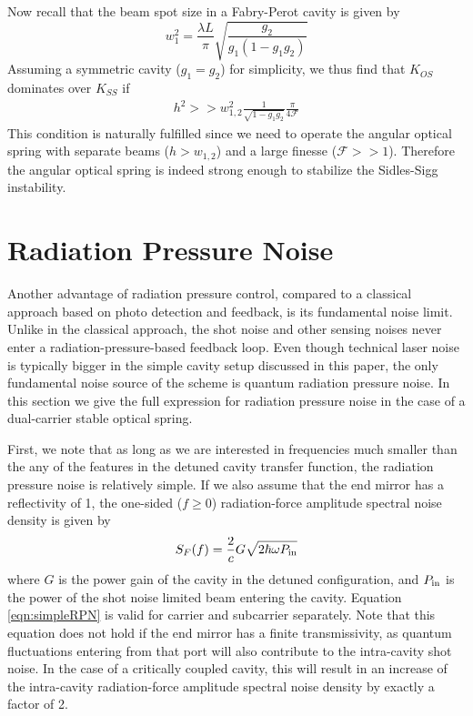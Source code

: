 \documentclass[%
 reprint,
 amsmath,amssymb,
 aps,
]{revtex4-1}
\begin{document}
Now recall that the beam spot size in a Fabry-Perot cavity is given by \cite{Siegman86}
\begin{equation}
w_1^2 = \frac{\lambda L}{\pi} \sqrt{\frac{g_2}{g_1(1-g_1 g_2)}}
\label{equ:spotsize1}
\end{equation} 
Assuming a symmetric cavity ($g_1=g_2$) for simplicity, we thus find that $K_{OS}$  dominates over $K_{SS}$ if
\begin{eqnarray}
\label{eqn:h2w}
h^2 >> w_{1,2}^2 \frac{1}{\sqrt{1-g_1 g_2}} \frac{\pi}{4 \mathcal{F}}
\end{eqnarray}
This condition is naturally fulfilled since we need to operate the angular optical spring with separate beams ($h>w_{1,2}$) and a large finesse ($\mathcal{F}>>1$). Therefore the angular optical spring is indeed strong enough to stabilize the Sidles-Sigg instability.

\section{Radiation Pressure Noise}
\label{sec:V}
Another advantage of radiation pressure control, compared to a classical approach based on photo detection and feedback, is its fundamental noise limit. Unlike in the classical approach, the shot noise and other sensing noises %
never enter a radiation-pressure-based feedback loop. Even though technical laser noise is typically bigger in the simple cavity setup discussed in this paper, the only fundamental noise source of the scheme is quantum radiation pressure noise. In this section we give the full expression for radiation pressure noise in the case of a dual-carrier stable optical spring.

First, we note that as long as we are interested in frequencies much smaller than the any of the features in the detuned cavity transfer function, the radiation pressure noise is relatively simple. If we also assume that the end mirror has a reflectivity of 1, the one-sided ($f\ge0$) radiation-force amplitude spectral noise density is given by
\begin{eqnarray}
\label{eqn:simpleRPN}
S_F (f) = \frac{2}{c} G \sqrt{2 \hbar \omega P_{\rm in}}
\end{eqnarray}
where $G$ is the power gain of the cavity in the detuned configuration, and $P_{\rm in}$ is the power of the shot noise limited beam entering the cavity.
Equation \ref{eqn:simpleRPN} is valid for carrier and subcarrier separately.
Note that this equation does not hold if the end mirror has a finite transmissivity, as quantum fluctuations entering from that port will also contribute to the intra-cavity shot noise. In the case of a critically coupled cavity, this will result in an increase of the intra-cavity radiation-force amplitude spectral noise density by exactly a factor of 2.
\end{document}
